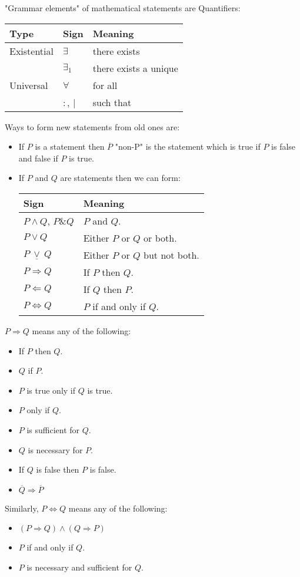 "Grammar elements" of mathematical statements are Quantifiers:
\begin{center}
\begin{tabularx}{.65\textwidth}{XXX}
\toprule
Type & Sign & Meaning \\
\toprule
Existential & $\exists$ & there exists \\
& $\exists_1$ & there exists a unique \\
\midrule
Universal & $\forall$ & for all \\
\midrule
& $:$, $|$ & such that \\
\bottomrule
\end{tabularx}
\end{center}
Ways to form new statements from old ones are:
\begin{itemize}
\item
If $P$ is a statement then $\overline P$ "non-P" is the statement which is true if $P$ is false and false if $P$ is true.
\item
If $P$ and $Q$ are statements then we can form:
\begin{center}
\begin{tabularx}{.6\textwidth}{XX}
\toprule
Sign & Meaning \\
\toprule
$P \wedge Q$, $P\& Q$ & $P$ and $Q$. \\
$P \vee Q$ & Either $P$ or $Q$ or both. \\
$P ~\underline{\vee} ~Q$ & Either $P$ or $Q$ but not both. \\ 
\midrule
$P \Rightarrow Q$ & If $P$ then $Q$. \\
$P \Leftarrow Q$ & If $Q$ then $P$. \\  
$P \Leftrightarrow Q$ & $P$ if and only if $Q$. \\
\bottomrule
\end{tabularx}
\end{center}

\end{itemize}

\begin{rk}
$P \Rightarrow Q$ means any of the following:
\begin{itemize}
\item
If $P$ then $Q$.
\item
$Q$ if $P$.
\item
$P$ is true only if $Q$ is true.
\item
$P$ only if $Q$.
\item
$P$ is sufficient for $Q$.
\item
$Q$ is necessary for $P$.
\item
If $Q$ is false then $P$ is false.
\item
$\overline{Q} \Rightarrow \overline{P}$
\end{itemize}
Similarly, $P \Leftrightarrow Q$ means any of the following:
\begin{itemize}
\item
$(P \Rightarrow Q) \wedge (Q \Rightarrow P)$
\item
$P$ if and only if $Q$.
\item
$P$ is necessary and sufficient for $Q$.
\end{itemize}
\end{rk}


